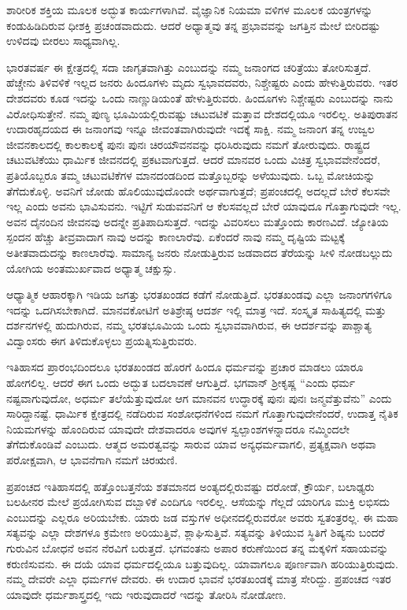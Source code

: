 ಶಾರೀರಿಕ ಶಕ್ತಿಯ ಮೂಲಕ ಅದ್ಭುತ ಕಾರ್ಯಗಳಾಗಿವೆ. ವೈಜ್ಞಾನಿಕ ನಿಯಮಾ ವಳಿಗಳ ಮೂಲಕ ಯಂತ್ರಗಳನ್ನು ಕಂಡುಹಿಡಿದಿರುವ ಧೀಶಕ್ತಿ ಪ್ರಚಂಡವಾದುದು. ಆದರೆ ಅಧ್ಯಾತ್ಮವು ತನ್ನ ಪ್ರಭಾವವನ್ನು ಜಗತ್ತಿನ ಮೇಲೆ ಬೀರಿದಷ್ಟು ಉಳಿದವು ಬೀರಲು ಸಾಧ್ಯವಾಗಿಲ್ಲ. 

ಭಾರತವರ್ಷ ಈ ಕ್ಷೇತ್ರದಲ್ಲಿ ಸದಾ ಜಾಗೃತವಾಗಿತ್ತು ಎಂಬುದನ್ನು ನಮ್ಮ ಜನಾಂಗದ ಚರಿತ್ರೆಯು ತೋರಿಸುತ್ತದೆ. ಹೆಚ್ಚೇನು ತಿಳಿವಳಿಕೆ ಇಲ್ಲದ ಜನರು ಹಿಂದೂಗಳು ಮೃದು ಸ್ವಭಾವದವರು, ನಿಶ್ಚೇಷ್ಟರು ಎಂದು ಹೇಳುತ್ತಿರುವರು. ಇತರ ದೇಶದವರು ಕೂಡ ಇದನ್ನು ಒಂದು ನಾಣ್ಣುಡಿಯಂತೆ ಹೇಳುತ್ತಿರುವರು. ಹಿಂದೂಗಳು ನಿಶ್ಚೇಷ್ಟರು ಎಂಬುದನ್ನು ನಾನು ವಿರೋಧಿಸುತ್ತೇನೆ. ನಮ್ಮ ಪುಣ್ಯ ಭೂಮಿಯಲ್ಲಿರುವಷ್ಟು ಚಟುವಟಿಕೆ ಮತ್ತಾವ ದೇಶದಲ್ಲಿಯೂ ಇರಲಿಲ್ಲ. ಅತಿ\break ಪುರಾತನ ಉದಾರಹೃದಯದ ಈ ಜನಾಂಗವು ಇನ್ನೂ ಜೀವಂತವಾಗಿರುವುದೇ ಇದಕ್ಕೆ ಸಾಕ್ಷಿ. ನಮ್ಮ ಜನಾಂಗ ತನ್ನ ಉಜ್ವಲ ಜೀವನಕಾಲದಲ್ಲಿ ಕಾಲಕಾಲಕ್ಕೆ ಪುನಃ ಪುನಃ ಚಿರಯೌವನವನ್ನು ಧರಿಸಿರುವುದು ನಮಗೆ ತೋರುವುದು. ರಾಷ್ಟ್ರದ ಚಟುವಟಿಕೆಯು ಧಾರ್ಮಿಕ ಜೀವನದಲ್ಲಿ ಪ್ರಕಟವಾಗುತ್ತದೆ. ಆದರೆ ಮಾನವರ ಒಂದು ವಿಚಿತ್ರ ಸ್ವಭಾವವೇನೆಂದರೆ, ಪ್ರತಿಯೊಬ್ಬರೂ ತಮ್ಮ ಚಟುವಟಿಕೆಗಳ ಮಾನದಂಡದಿಂದ ಮತ್ತೊಬ್ಬರನ್ನು ಅಳೆಯುವುದು. ಒಬ್ಬ ಮೋಚಿಯನ್ನು ತೆಗೆದುಕೊಳ್ಳಿ. ಅವನಿಗೆ ಜೋಡು ಹೊಲಿಯುವುದೊಂದೇ ಅರ್ಥವಾಗುತ್ತದೆ; ಪ್ರಪಂಚದಲ್ಲಿ ಅದಲ್ಲದೆ ಬೇರೆ ಕೆಲಸವೇ ಇಲ್ಲ ಎಂದು ಅವನು ಭಾವಿಸುವನು. ಇಟ್ಟಿಗೆ ಸುಡುವವನಿಗೆ ಆ ಕೆಲಸವಲ್ಲದೆ ಬೇರೆ ಯಾವುದೂ ಗೊತ್ತಾಗುವುದೇ ಇಲ್ಲ. ಅವನ ದೈನಂದಿನ ಜೀವನವು ಅದನ್ನೇ ಪ್ರತಿಪಾದಿಸುತ್ತದೆ. ಇದನ್ನು ವಿವರಿಸಲು ಮತ್ತೊಂದು ಕಾರಣವಿದೆ. ಜ್ಯೋತಿಯ ಸ್ಪಂದನ ಹೆಚ್ಚು ತೀವ್ರವಾದಾಗ ನಾವು ಅದನ್ನು ಕಾಣಲಾರೆವು. ಏಕೆಂದರೆ ನಾವು ನಮ್ಮ ದೃಷ್ಟಿಯ ಮಟ್ಟಕ್ಕೆ ಅತೀತವಾದುದನ್ನು ಕಾಣಲಾರೆವು. ಸಾಮಾನ್ಯ ಜನರು ನೋಡುತ್ತಿರುವ ಜಡವಾದದ ತೆರೆಯನ್ನು ಸೀಳಿ ನೋಡಬಲ್ಲುದು ಯೋಗಿಯ ಅಂತಮುರ್ಖವಾದ ಅಧ್ಯಾತ್ಮ ಚಕ್ಷುಸ್ಸು. 

ಆಧ್ಯಾತ್ಮಿಕ ಆಹಾರಕ್ಕಾಗಿ ಇಡಿಯ ಜಗತ್ತು ಭರತಖಂಡದ ಕಡೆಗೆ ನೋಡುತ್ತಿದೆ. ಭರತಖಂಡವು ಎಲ್ಲಾ ಜನಾಂಗಗಳಿಗೂ ಇದನ್ನು ಒದಗಿಸಬೇಕಾಗಿದೆ. ಮಾನವಕೋಟಿಗೆ ಅತಿಶ್ರೇಷ್ಠ ಆದರ್ಶ ಇಲ್ಲಿ ಮಾತ್ರ ಇದೆ. ಸಂಸ್ಕೃತ ಸಾಹಿತ್ಯದಲ್ಲಿ ಮತ್ತು ದರ್ಶನಗಳಲ್ಲಿ ಹುದುಗಿರುವ, ನಮ್ಮ ಭರತಭೂಮಿಯ ಒಂದು ಸ್ವಭಾವವಾಗಿರುವ, ಈ ಆದರ್ಶವನ್ನು ಪಾಶ್ಚಾತ್ಯ ವಿದ್ವಾಂಸರು ಈಗ ತಿಳಿದುಕೊಳ್ಳಲು ಪ್ರಯತ್ನಿಸುತ್ತಿರುವರು. 

ಇತಿಹಾಸದ ಪ್ರಾರಂಭದಿಂದಲೂ ಭರತಖಂಡದ ಹೊರಗೆ ಹಿಂದೂ ಧರ್ಮವನ್ನು ಪ್ರಚಾರ ಮಾಡಲು ಯಾರೂ ಹೋಗಲಿಲ್ಲ. ಆದರೆ ಈಗ ಒಂದು ಅದ್ಭುತ ಬದಲಾವಣೆ ಆಗುತ್ತಿದೆ. ಭಗವಾನ್​ ಶ‍್ರೀಕೃಷ್ಣ “ಎಂದು ಧರ್ಮ ನಷ್ಟವಾಗುವುದೋ, ಅಧರ್ಮ ತಲೆಯೆತ್ತುವುದೋ ಆಗ ಮಾನವನ ಉದ್ಧಾರಕ್ಕೆ ಪುನಃ ಪುನಃ ಜನ್ಮವೆತ್ತುವೆನು” ಎಂದು ಸಾರಿದ್ದಾನಷ್ಟೆ. ಧಾರ್ಮಿಕ ಕ್ಷೇತ್ರದಲ್ಲಿ ನಡೆದಿರುವ ಸಂಶೋಧನೆಗಳಿಂದ ನಮಗೆ ಗೊತ್ತಾಗುವುದೇನೆಂದರೆ, ಉದಾತ್ತ ನೈತಿಕ ನಿಯಮಗಳನ್ನು ಹೊಂದಿರುವ ಯಾವುದೇ ದೇಶವಾದರೂ ಅವುಗಳ ಸ್ವಲ್ಪಾಂಶಗಳನ್ನಾದರೂ ನಮ್ಮಿಂದಲೇ ತೆಗೆದುಕೊಂಡಿವೆ ಎಂಬುದು. ಆತ್ಮದ ಅಮರತ್ವವನ್ನು ಸಾರುವ ಯಾವ ಅನ್ಯಧರ್ಮವಾಗಲಿ, ಪ್ರತ್ಯಕ್ಷವಾಗಿ ಅಥವಾ ಪರೋಕ್ಷವಾಗಿ, ಆ ಭಾವನೆಗಾಗಿ ನಮಗೆ ಚಿರಋಣಿ. 

ಪ್ರಪಂಚದ ಇತಿಹಾಸದಲ್ಲಿ ಹತ್ತೊಂಬತ್ತನೆಯ ಶತಮಾನದ ಅಂತ್ಯದಲ್ಲಿರುವಷ್ಟು ದರೋಡೆ, ಕ್ರೌರ್ಯ, ಬಲಾಢ್ಯರು ಬಲಹೀನರ ಮೇಲೆ ಪ್ರಯೋಗಿಸುವ ದಬ್ಬಾಳಿಕೆ ಎಂದಿಗೂ ಇರಲಿಲ್ಲ. ಆಸೆಯನ್ನು ಗೆಲ್ಲದೆ ಯಾರಿಗೂ ಮುಕ್ತಿ ಲಭಿಸದು ಎಂಬುದನ್ನು ಎಲ್ಲರೂ ಅರಿಯಬೇಕು. ಯಾರು ಜಡ ವಸ್ತುಗಳ ಅಧೀನದಲ್ಲಿರುವರೋ ಅವರು ಸ್ವತಂತ್ರರಲ್ಲ. ಈ ಮಹಾ ಸತ್ಯವನ್ನು ಎಲ್ಲಾ ದೇಶಗಳೂ ಕ್ರಮೇಣ ಅರಿಯುತ್ತಿವೆ, ಶ್ಲಾಘಿಸುತ್ತಿವೆ. ಸತ್ಯವನ್ನು ತಿಳಿಯುವ ಸ್ಥಿತಿಗೆ ಶಿಷ್ಯನು ಬಂದರೆ ಗುರುವಿನ ಬೋಧನೆ ಅವನ ನೆರವಿಗೆ ಬರುತ್ತದೆ. ಭಗವಂತನು ಅಪಾರ ಕರುಣೆಯಿಂದ ತನ್ನ ಮಕ್ಕಳಿಗೆ ಸಹಾಯವನ್ನು ಕರುಣಿಸುವನು. ಈ ದಯೆ ಯಾವ ಧರ್ಮದಲ್ಲಿಯೂ ಬತ್ತುವುದಿಲ್ಲ. ಯಾವಾಗಲೂ ಪೂರ್ಣವಾಗಿ ಹರಿಯುತ್ತಿರುವುದು. ನಮ್ಮ ದೇವರೇ ಎಲ್ಲಾ ಧರ್ಮಗಳ ದೇವರು. ಈ ಉದಾರ ಭಾವನೆ ಭರತಖಂಡಕ್ಕೆ ಮಾತ್ರ ಸೇರಿದ್ದು. ಪ್ರಪಂಚದ ಇತರ ಯಾವುದೇ ಧರ್ಮಶಾಸ್ತ್ರದಲ್ಲಿ ಇದು ಇರುವುದಾದರೆ ಇದನ್ನು ತೋರಿಸಿ ನೋಡೋಣ. 

